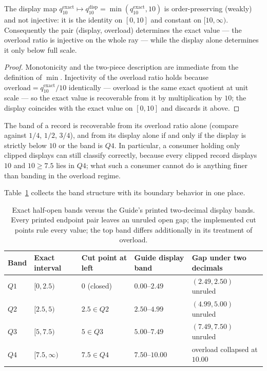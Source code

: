 \begin{lemma}\label{ch08:lem:display}
The display map $q_{10}^{\mathrm{exact}} \mapsto q_{10}^{\mathrm{disp}}
= \min(q_{10}^{\mathrm{exact}}, 10)$ is order-preserving (weakly) and
not injective: it is the identity on $[0, 10]$ and constant on
$[10, \infty)$. Consequently the pair (display, overload) determines
the exact value --- the overload ratio is injective on the whole ray
--- while the display alone determines it only below full scale.
\end{lemma}

\begin{proof}
Monotonicity and the two-piece description are immediate from the
definition of $\min$. Injectivity of the overload ratio holds because
$\mathrm{overload} = q_{10}^{\mathrm{exact}} / 10$ identically ---
overload is the same exact quotient at unit scale --- so the exact
value is recoverable from it by multiplication by $10$; the display
coincides with the exact value on $[0,10]$ and discards it above.
\end{proof}

\begin{corollary}\label{ch08:cor:recover}
The band of a record is recoverable from its overload ratio alone
(compare against $1/4$, $1/2$, $3/4$), and from its display alone if
and only if the display is strictly below $10$ or the band is $Q4$.
In particular, a consumer holding only clipped displays can still
classify correctly, because every clipped record displays $10$ and
$10 \ge 7.5$ lies in $Q4$; what such a consumer cannot do is anything
finer than banding in the overload regime.
\end{corollary}

Table~\ref{ch08:tab:bands} collects the band structure with its
boundary behavior in one place.

\begin{table}[htbp]
\centering
\begin{tabular}{@{}lllll@{}}
\toprule
Band & Exact interval & Cut point at left & Guide display band & Gap under two decimals \\
\midrule
$Q1$ & $[0, 2.5)$ & $0$ (closed) & $0.00$--$2.49$ & $(2.49, 2.50)$ unruled \\
$Q2$ & $[2.5, 5)$ & $2.5 \in Q2$ & $2.50$--$4.99$ & $(4.99, 5.00)$ unruled \\
$Q3$ & $[5, 7.5)$ & $5 \in Q3$ & $5.00$--$7.49$ & $(7.49, 7.50)$ unruled \\
$Q4$ & $[7.5, \infty)$ & $7.5 \in Q4$ & $7.50$--$10.00$ & overload collapsed at $10.00$ \\
\bottomrule
\end{tabular}
\caption{Exact half-open bands versus the Guide's printed two-decimal
display bands. Every printed endpoint pair leaves an unruled open gap;
the implemented cut points rule every value; the top band differs
additionally in its treatment of overload.}
\label{ch08:tab:bands}
\end{table}

